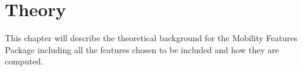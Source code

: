 \chapter{Theory}
\label{chapter:03}
This chapter will describe the theoretical background for the Mobility Features Package including all the features chosen to be included and how they are computed.


